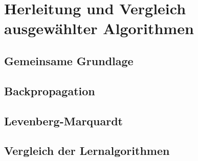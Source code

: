 


\section{Herleitung und Vergleich ausgewählter Algorithmen}\label{sec:algorithm}

\subsection{Gemeinsame Grundlage}

\subsection{Backpropagation}\label{sec:Backpropagation}

\subsection{Levenberg-Marquardt}\label{sec:LM_herleitung}

\subsection{Vergleich der Lernalgorithmen}\label{sec:vergleich_la}
